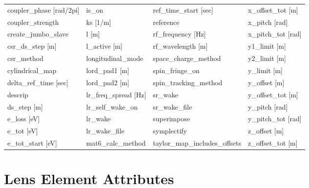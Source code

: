 \begin{tabular}{llll}
coupler_phase [rad/2pi]          & is_on                            & ref_time_start [sec]             & x_offset_tot [m]                 \\
coupler_strength                 & ks [1/m]                         & reference                        & x_pitch [rad]                    \\
create_jumbo_slave               & l [m]                            & rf_frequency [Hz]                & x_pitch_tot [rad]                \\
csr_ds_step [m]                  & l_active [m]                     & rf_wavelength [m]                & y1_limit [m]                     \\
csr_method                       & longitudinal_mode                & space_charge_method              & y2_limit [m]                     \\
cylindrical_map                  & lord_pad1 [m]                    & spin_fringe_on                   & y_limit [m]                      \\
delta_ref_time [sec]             & lord_pad2 [m]                    & spin_tracking_method             & y_offset [m]                     \\
descrip                          & lr_freq_spread [Hz]              & sr_wake                          & y_offset_tot [m]                 \\
ds_step [m]                      & lr_self_wake_on                  & sr_wake_file                     & y_pitch [rad]                    \\
e_loss [eV]                      & lr_wake                          & superimpose                      & y_pitch_tot [rad]                \\
e_tot [eV]                       & lr_wake_file                     & symplectify                      & z_offset [m]                     \\
e_tot_start [eV]                 & mat6_calc_method                 & taylor_map_includes_offsets      & z_offset_tot [m]                 \\
 \bottomrule
 \end{tabular}
 \vfill
 
 \section{Lens Element Attributes}
 \label{s:list.lens}
 
